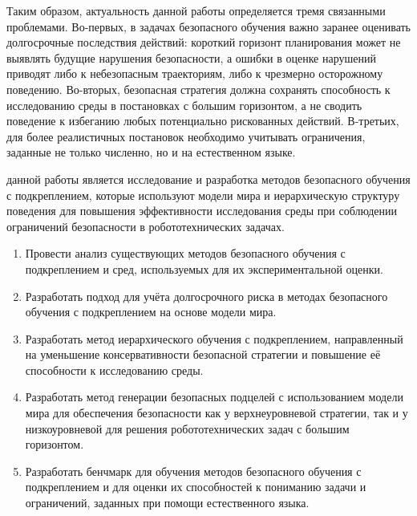 Таким образом, актуальность данной работы определяется тремя связанными проблемами. Во-первых, в задачах безопасного обучения важно заранее оценивать долгосрочные последствия действий: короткий горизонт планирования может не выявлять будущие нарушения безопасности, а ошибки в оценке нарушений приводят либо к небезопасным траекториям, либо к чрезмерно осторожному поведению. Во-вторых, безопасная стратегия должна сохранять способность к исследованию среды в постановках с большим горизонтом, а не сводить поведение к избеганию любых потенциально рискованных действий. В-третьих, для более реалистичных постановок необходимо учитывать ограничения, заданные не только численно, но и на естественном языке.

{\aim} данной работы является исследование и разработка методов безопасного обучения с подкреплением, которые используют модели мира и иерархическую структуру поведения для повышения эффективности исследования среды при соблюдении ограничений безопасности в робототехнических задачах.

{\tasksintro}
\begin{enumerate}[beginpenalty=10000]
  \item Провести анализ существующих методов безопасного обучения с подкреплением и сред, используемых для их экспериментальной оценки.
  \item Разработать подход для учёта долгосрочного риска в методах безопасного обучения с подкреплением на основе модели мира.
  \item Разработать метод иерархического обучения с подкреплением, направленный на уменьшение консервативности безопасной стратегии и повышение её способности к исследованию среды.
  \item Разработать метод генерации безопасных подцелей с использованием модели мира для обеспечения безопасности как у верхнеуровневой стратегии, так и у низкоуровневой для решения робототехнических задач с большим горизонтом.
  \item Разработать бенчмарк для обучения методов безопасного обучения с подкреплением и для оценки их способностей к пониманию задачи и ограничений, заданных при помощи естественного языка.
\end{enumerate}

